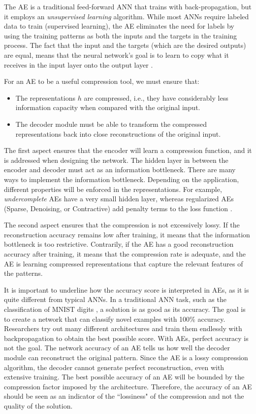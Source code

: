 \documentclass[runningheads]{llncs}
\begin{document}
The AE is a traditional feed-forward ANN that trains with back-propagation, but it employs an \textit{unsupervised learning} algorithm. While most ANNs require labeled data to train (supervised learning), the AE eliminates the need for labels by using the training patterns as both the inputs and the targets in the training process. The fact that the input and the targets (which are the desired outputs) are equal, means that the neural network's goal is to learn to copy what it receives in the input layer onto the output layer \cite{bengio2017deep}.

For an AE to be a useful compression tool, we must ensure that:
\begin{itemize}
    \item The representations $h$ are compressed, i.e., they have considerably less information capacity when compared with the original input.
    \item The decoder module must be able to transform the compressed representations back into close reconstructions of the original input.
\end{itemize}

The first aspect ensures that the encoder will learn a compression function, and it is addressed when designing the network.
The hidden layer in between the encoder and decoder must act as an information bottleneck.
There are many ways to implement the information bottleneck. Depending on the application, different properties will be enforced in the representations. For example, \textit{undercomplete} AEs have a very small hidden layer, whereas regularized AEs (Sparse, Denoising, or Contractive) add penalty terms to the loss function \cite{vincent2010stacked}.

The second aspect ensures that the compression is not excessively lossy. If the reconstruction accuracy remains low after training, it means that the information bottleneck is too restrictive. Contrarily, if the AE has a good reconstruction accuracy after training, it means that the compression rate is adequate, and the AE is learning compressed representations that capture the relevant features of the patterns.

It is important to underline how the accuracy score is interpreted in AEs, as it is quite different from typical ANNs. In a traditional ANN task, such as the classification of MNIST digits \cite{lecun1998mnist}, a solution is as good as its accuracy. The goal is to create a network that can classify novel examples with 100\% accuracy. Researchers try out many different architectures and train them endlessly with backpropagation to obtain the best possible score. 
With AEs, perfect accuracy is not the goal. The network accuracy of an AE tells us how well the decoder module can reconstruct the original pattern. Since the AE is a lossy compression algorithm, the decoder cannot generate perfect reconstruction, even with extensive training. The best possible accuracy of an AE will be bounded by the compression factor imposed by the architecture. Therefore, the accuracy of an AE should be seen as an indicator of the ``lossiness" of the compression and not the quality of the solution.
\end{document}
